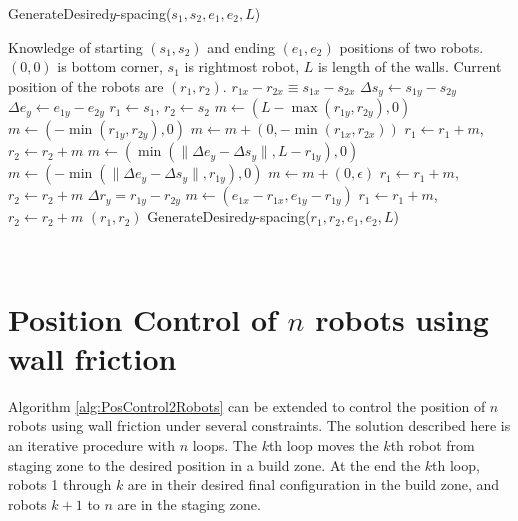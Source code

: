 \begin{algorithm}
\caption{GenerateDesired$y$-spacing($s_1,s_2,e_1,e_2,L$)}\label{alg:YControl}
\begin{algorithmic}[1]
\Require Knowledge of starting $(s_1,s_2)$ and ending $(e_1,e_2)$ positions of  two robots. 
$(0,0)$ is bottom corner, $s_1$ is rightmost robot, 
 $L$ is length of the walls. Current position of the robots are $(r_1,r_2)$.
\Ensure   $ r_{1x} - r_{2x}  \equiv s_{1x} - s_{2x} $   %
\State $ \Delta s_y  \gets s_{1y} - s_{2y} $
\State $ \Delta e_y \gets e_{1y} - e_{2y} $
\State $ r_1 \gets s_1$, $ r_2 \gets s_2$
\State $ m \gets ( L-\max( r_{1y},r_{2y}) ,0)   $ 
\Else 
\State  $ m \gets ( -\min( r_{1y},r_{2y}),0 )    $ 
\EndIf
\State $m  \gets  m + (0, -\min( r_{1x},r_{2x} ))$ 
\State $ r_1 \gets r_1+m$, $ r_2 \gets r_2+m$ 
\State $ m \gets (\min(\|\Delta e_y - \Delta s_y \|, L- r_{1y}), 0)$  
\Else
\State $ m \gets (-\min(\|\Delta e_y - \Delta s_y \|, r_{1y}), 0)$
\EndIf 
\State $m  \gets  m + (0, \epsilon)$ 
\State $ r_1 \gets r_1+m$, $ r_2 \gets r_2+m$ 
\State $\Delta r_y = r_{1y} - r_{2y}$
\State   $ m \gets (e_{1x}-r_{1x}, e_{1y}-r_{1y})$
\State $ r_1 \gets r_1+m$, $ r_2 \gets r_2+m$ 
\State  \Return $(r_1,r_2)$
\Else   
\State \Return GenerateDesired$y$-spacing($r_1,r_2,e_1,e_2,L$)
\EndIf
\end{algorithmic}
\end{algorithm}



\


\section{Position Control of $n$ robots using wall friction}\label{sec:PostionControlnRobots}
Algorithm \ref{alg:PosControl2Robots}  can be extended to control the position of $n$ robots using wall friction under several constraints. The solution described here is an iterative procedure with $n$ loops. The $k$th loop moves the $k$th robot from staging zone to the desired position in a build zone. At the end the $k$th loop, robots 1 through $k$ are in their desired final configuration in the build zone, and robots $k+1$ to $n$ are in the staging zone.


